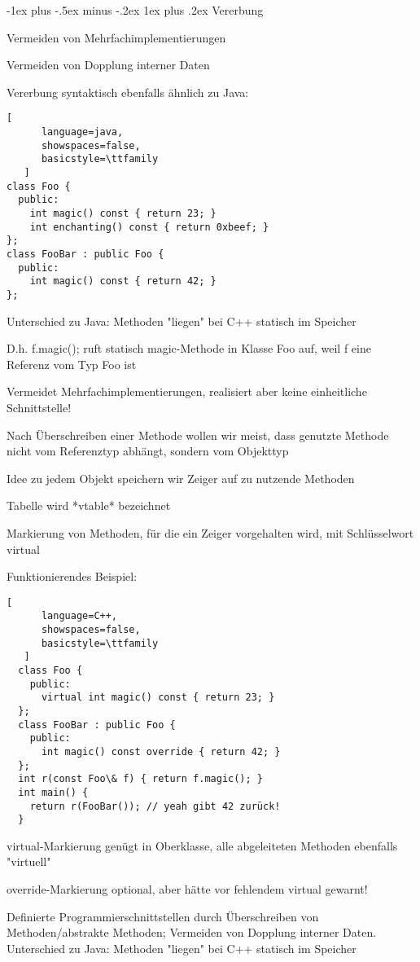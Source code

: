 \documentclass[10pt]{article}
\makeatletter
\renewcommand{\subsubsection}{\@startsection{subsubsection}{3}{0mm}%
                                {-1ex plus -.5ex minus -.2ex}%
                                {1ex plus .2ex}%
                                {\normalfont\small\bfseries}}
\makeatother
\begin{document}
\begin{itemize*}
\subsubsection{Vererbung}
\begin{itemize*}
  \item Vermeiden von Mehrfachimplementierungen
  \item Vermeiden von Dopplung interner Daten
  \item Vererbung syntaktisch ebenfalls ähnlich zu Java:
  \begin{lstlisting}[
      language=java,
      showspaces=false,
      basicstyle=\ttfamily
   ]
class Foo {
  public:
    int magic() const { return 23; }
    int enchanting() const { return 0xbeef; }
};
class FooBar : public Foo {
  public:
    int magic() const { return 42; }
};
\end{lstlisting}
\end{itemize*}

\begin{itemize*}
  \item Unterschied zu Java: Methoden "liegen" bei C++ statisch im Speicher
  \begin{itemize*}
    \item D.h. f.magic(); ruft statisch magic-Methode in Klasse Foo auf, weil f eine Referenz vom Typ Foo ist
    \item Vermeidet Mehrfachimplementierungen, realisiert aber keine einheitliche Schnittstelle!
  \end{itemize*}
  \item Nach Überschreiben einer Methode wollen wir meist, dass genutzte Methode nicht vom Referenztyp abhängt, sondern vom Objekttyp
  \begin{itemize*}
    \item Idee zu jedem Objekt speichern wir Zeiger auf zu nutzende Methoden
    \item Tabelle wird *vtable* bezeichnet
    \item Markierung von Methoden, für die ein Zeiger vorgehalten wird, mit Schlüsselwort virtual
    \item Funktionierendes Beispiel:
    \begin{lstlisting}[
      language=C++,
      showspaces=false,
      basicstyle=\ttfamily
   ]
  class Foo {
    public:
      virtual int magic() const { return 23; }
  };
  class FooBar : public Foo {
    public:
      int magic() const override { return 42; }
  };
  int r(const Foo\& f) { return f.magic(); }
  int main() {
    return r(FooBar()); // yeah gibt 42 zurück!
  }
  \end{lstlisting}
    \item virtual-Markierung genügt in Oberklasse, alle abgeleiteten Methoden ebenfalls "virtuell"
    \item override-Markierung optional, aber hätte vor fehlendem virtual gewarnt!
  \end{itemize*}
\end{itemize*}
Definierte Programmierschnittstellen durch Überschreiben von Methoden/abstrakte Methoden; Vermeiden von Dopplung interner Daten.
Unterschied zu Java: Methoden "liegen" bei C++ statisch im Speicher


\end{itemize*}
\end{document}
